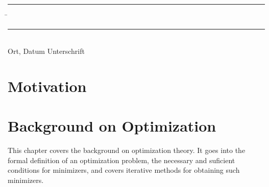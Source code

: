 \documentclass[12pt]{article}
\theoremstyle{definition}
\numberwithin{equation}{section}
\begin{document}
\vspace*{3em}

\begin{tabbing}
  \rule{.4\textwidth}{1pt} \hspace*{.2\textwidth}
  \= \rule{.4\textwidth}{1pt} \\
  Ort, Datum \> Unterschrift
\end{tabbing}

\newpage
\mbox{}
\newpage
\tableofcontents
\newpage
\listoffigures
\newpage

\section{Motivation}
\label{sec:Motivation}

\section{Background on Optimization}
\label{sec:Optimization}
This chapter covers the background on optimization theory. It goes into the formal definition of an optimization problem, the necessary and suficient conditions for minimizers, and covers iterative methods for obtaining such minimizers.
\end{document}
